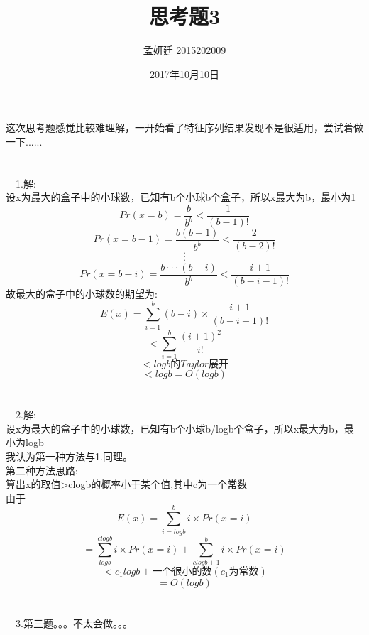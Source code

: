 \documentclass[19pt,a4paper]{article}
\title{思考题3}
\author{孟妍廷 2015202009}
\date{2017年10月10日}
\begin{document}
\maketitle
这次思考题感觉比较难理解，一开始看了特征序列结果发现不是很适用，尝试着做一下......\\
\\
\\
\indent\ \ 1.解:\\
\indent 设x为最大的盒子中的小球数，已知有b个小球b个盒子，所以x最大为b，最小为1\\
$$Pr(x=b)=\frac{b}{b^b}<\frac{1}{(b-1)!}$$
$$Pr(x=b-1)=\frac{b(b-1)}{b^b}<\frac{2}{(b-2)!}$$
$$\cdot$$
$$\cdot$$
$$\cdot$$
$$Pr(x=b-i)=\frac{b\cdot\cdot\cdot(b-i)}{b^b}<\frac{i+1}{(b-i-1)!}$$
\indent 故最大的盒子中的小球数的期望为:\\
$$E(x)=\sum_{i=1}^{b}(b-i)\times\frac{i+1}{(b-i-1)!}$$
$$<\sum_{i=1}^{b}\frac{(i+1)^2}{i!}$$
$$<logb的Taylor展开$$
$$<logb=O(logb)$$
\\
\\
\indent\ \ 2.解:\\
\indent 设x为最大的盒子中的小球数，已知有b个小球b/logb个盒子，所以x最大为b，最小为logb\\
\indent 我认为第一种方法与1.同理。\\
\indent 第二种方法思路:\\
\indent 算出x的取值>clogb的概率小于某个值,其中c为一个常数\\
\indent 由于\\
$$E(x)=\sum_{i=logb}^{b}i\times Pr(x=i)$$
$$=\sum_{logb}^{clogb}i\times Pr(x=i)+\sum_{clogb+1}^{b}i\times Pr(x=i)$$
$$< c_1logb+一个很小的数(c_1为常数)$$
$$=O(logb)$$
\\
\\
\indent\ \ 3.第三题。。。不太会做。。。
\end{document}
